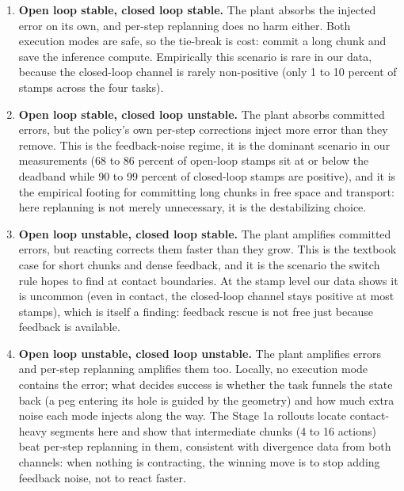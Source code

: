 \documentclass[11pt]{article}
\begin{document}
\begin{enumerate}[leftmargin=2em]
  \item \textbf{Open loop stable, closed loop stable.} The plant absorbs the
        injected error on its own, and per-step replanning does no harm either.
        Both execution modes are safe, so the tie-break is cost: commit a long
        chunk and save the inference compute. Empirically this scenario is rare
        in our data, because the closed-loop channel is rarely non-positive
        (only 1 to 10 percent of stamps across the four tasks).
  \item \textbf{Open loop stable, closed loop unstable.} The plant absorbs
        committed errors, but the policy's own per-step corrections inject more
        error than they remove. This is the feedback-noise regime, it is the
        dominant scenario in our measurements (68 to 86 percent of open-loop
        stamps sit at or below the deadband while 90 to 99 percent of
        closed-loop stamps are positive), and it is the empirical footing for
        committing long chunks in free space and transport: here replanning is
        not merely unnecessary, it is the destabilizing choice.
  \item \textbf{Open loop unstable, closed loop stable.} The plant amplifies
        committed errors, but reacting corrects them faster than they grow.
        This is the textbook case for short chunks and dense feedback, and it
        is the scenario the switch rule hopes to find at contact boundaries.
        At the stamp level our data shows it is uncommon (even in contact, the
        closed-loop channel stays positive at most stamps), which is itself a
        finding: feedback rescue is not free just because feedback is
        available.
  \item \textbf{Open loop unstable, closed loop unstable.} The plant amplifies
        errors and per-step replanning amplifies them too. Locally, no
        execution mode contains the error; what decides success is whether the
        task funnels the state back (a peg entering its hole is guided by the
        geometry) and how much extra noise each mode injects along the way.
        The Stage 1a rollouts locate contact-heavy segments here and show that
        intermediate chunks (4 to 16 actions) beat per-step replanning in
        them, consistent with divergence data from both channels: when
        nothing is contracting, the winning move is to stop adding feedback
        noise, not to react faster.
\end{enumerate}
\end{document}
